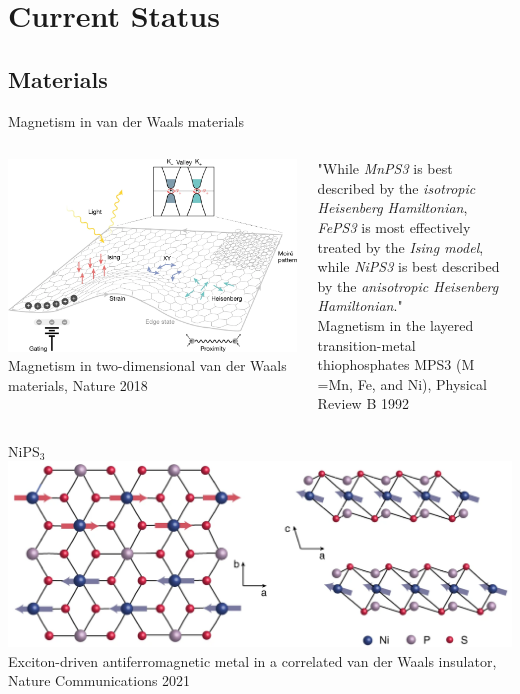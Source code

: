 \section{Current Status}
\sectionframe

\subsection{Materials}
\begin{frame}{Magnetism in van der Waals materials}
	\begin{columns}
		\centering
		\includegraphics[width=\textwidth]{image11.png}\\
		\small\raggedleft Magnetism in two-dimensional van der Waals materials, Nature 2018

		"While \emph{MnPS3} is best described by the \emph{isotropic Heisenberg Hamiltonian}, \\
		\emph{FePS3} is most effectively treated by the \emph{Ising model}, \\
		while \emph{NiPS3} is best described by the \emph{anisotropic Heisenberg Hamiltonian}."\\
		\vspace{1cm}
		\small\raggedleft
		Magnetism in the layered transition-metal thiophosphates MPS3 (M =Mn, Fe, and Ni), Physical Review B 1992
	\end{columns}
\end{frame}

\begin{frame}{NiPS$_3$}
	\centering
	\includegraphics[width=.8\textwidth]{image13.png}
	\\\vspace{1cm}
	\small\raggedleft
	Exciton-driven antiferromagnetic metal in a correlated van der Waals insulator,
	Nature Communications 2021
\end{frame}

